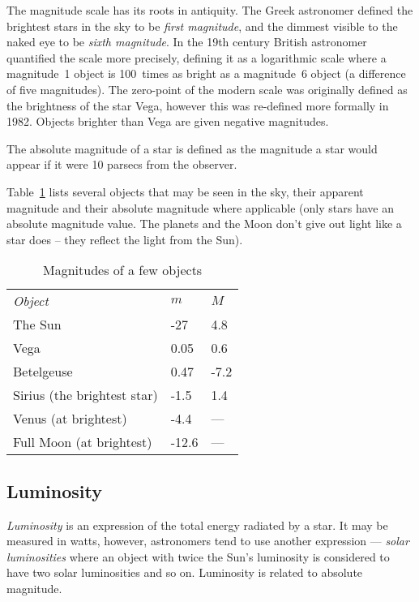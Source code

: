 The magnitude scale has its roots in antiquity. The Greek astronomer
 defined the brightest stars in the sky to be \emph{first
magnitude}, and the dimmest visible to the naked eye to be \emph{sixth
magnitude}. In the 19th century British astronomer 
quantified the scale more precisely, defining it as a logarithmic scale
where a magnitude~1 object is 100~times as bright as a magnitude~6
object (a difference of five magnitudes). The zero-point of the modern
scale was originally defined as the brightness of the star Vega, however
this was re-defined more formally in 1982\cite{landolt}. Objects brighter
than Vega are given negative magnitudes.

The absolute magnitude of a star is defined as the magnitude a star
would appear if it were 10 parsecs from the observer.

Table~\ref{tab:Concepts:Magnitudes} lists several objects that may be seen
in the sky, their apparent magnitude and their absolute magnitude where
applicable (only stars have an absolute magnitude value. The planets and
the Moon don't give out light like a star does -- they reflect the light
from the Sun).

\begin{table}[htb]
  \centering
\begin{longtable}[c]{@{}lll@{}}
\toprule
\emph{Object} & $m$ & $M$\tabularnewline
The Sun & -27 & 4.8\tabularnewline
Vega & 0.05 & 0.6\tabularnewline
Betelgeuse & 0.47 & -7.2\tabularnewline
Sirius (the brightest star) & -1.5 & 1.4\tabularnewline
Venus (at brightest) & -4.4 & ---\tabularnewline
Full Moon (at brightest) & -12.6 & ---\tabularnewline
\bottomrule
\end{longtable}
  \caption{Magnitudes of a few objects}
  \label{tab:Concepts:Magnitudes}
\end{table}


\subsection{Luminosity}
\label{sec:Concepts:Luminosity}

\emph{Luminosity} is an expression of the total energy radiated by a
star. It may be measured in watts, however, astronomers tend to use
another expression --- \emph{solar luminosities} where an object with
twice the Sun's luminosity is considered to have two solar luminosities
and so on. Luminosity is related to absolute magnitude.

